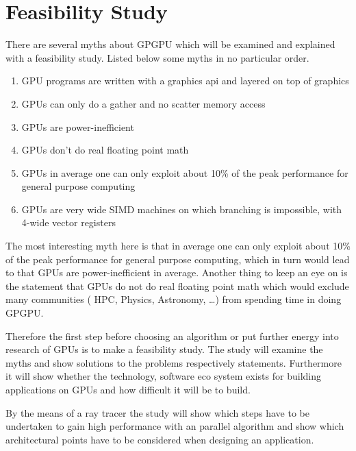 \chapter{Feasibility Study}
\label{chap:feas}
There are several myths about \gls{GPGPU} which will be examined and explained 
with a feasibility study. Listed below some myths in no particular order.
\begin{enumerate}
	\item \gls{GPU} programs are written with a graphics api and layered on top 
		of graphics
	\label{enum:api}
	\item \glspl{GPU} can only do a gather and no scatter memory access
	\label{enum:gather}
	\item \glspl{GPU} are power-inefficient
	\label{enum:ineff}
	\item \glspl{GPU} don't do real floating point math
	\label{enum:float}
	\item \glspl{GPU} in average one can only exploit about 10\% of the peak 
		performance for general purpose computing
	\label{enum:exploit}
	\item \glspl{GPU} are very wide \gls{SIMD} machines on which branching is 	  
		impossible, with 4-wide vector registers
 	\label{enum:simd}
\end{enumerate}

The most interesting myth here is that in average one can only exploit about
10\% of the peak performance for general purpose computing, which in turn would 
lead to that \glspl{GPU} are power-inefficient in average. Another thing to 
keep an eye on is the statement that \glspl{GPU} do not do real floating point
math which would exclude many communities ( \gls{HPC}, Physics, Astronomy, \ldots)
 from spending time in doing \gls{GPGPU}. 

Therefore the first step before choosing an algorithm or put further energy into
research of \glspl{GPU} is to make a feasibility study. The study will examine
the myths and show solutions to the problems respectively statements.
Furthermore it will show whether the technology, software eco system exists for
building applications on \glspl{GPU} and how difficult it will be to build.

By the means of a ray tracer the study will show which steps have to be 
undertaken to gain high performance with an parallel algorithm and show which 
architectural points have to be considered when designing an application.

